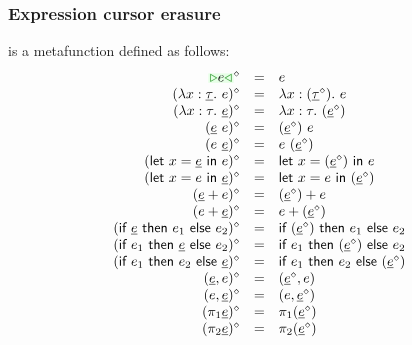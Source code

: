 \documentclass[formalism.tex]{subfiles}
\begin{document}
\subsubsection{Expression cursor erasure}
\label{sec:untyped-expression-cursor-erasure}
\judgbox{\ensuremath{\cursorErase{\ZMV}}} is a metafunction defined as follows:
%
\[\begin{array}{rcl}
  \cursorErasesToRow{\ZCursor{\EMV}}{\EMV} \\
  \cursorErasesToRow{(\ZLamT{x}{\ZTMV}{\EMV})}{\ELam{x}{(\cursorErase{\ZTMV})}{\EMV}} \\
  \cursorErasesToRow{(\ZLamE{x}{\TMV}{\ZMV})}{\ELam{x}{\TMV}{(\cursorErase{\ZMV})}} \\
  \cursorErasesToRow{(\ZApL{\ZMV}{\EMV})}{\EAp{(\cursorErase{\ZMV})}{\EMV}} \\
  \cursorErasesToRow{(\ZApR{\EMV}{\ZMV})}{\EAp{\EMV}{(\cursorErase{\ZMV})}} \\
  \cursorErasesToRow{(\ZLetL{x}{\ZMV}{\EMV})}{\ELet{x}{(\cursorErase{\ZMV})}{\EMV}} \\
  \cursorErasesToRow{(\ZLetR{x}{\EMV}{\ZMV})}{\ELet{x}{\EMV}{(\cursorErase{\ZMV})}} \\
  \cursorErasesToRow{(\ZPlusL{\ZMV}{\EMV})}{\EPlus{(\cursorErase{\ZMV})}{\EMV}} \\
  \cursorErasesToRow{(\ZPlusR{\EMV}{\ZMV})}{\EPlus{\EMV}{(\cursorErase{\ZMV})}} \\
  \cursorErasesToRow{(\ZIfC{\ZMV}{\EMV_1}{\EMV_2})}{\EIf{(\cursorErase{\ZMV})}{\EMV_1}{\EMV_2}} \\
  \cursorErasesToRow{(\ZIfL{\EMV_1}{\ZMV}{\EMV_2})}{\EIf{\EMV_1}{(\cursorErase{\ZMV})}{\EMV_2}} \\
  \cursorErasesToRow{(\ZIfL{\EMV_1}{\EMV_2}{\ZMV})}{\EIf{\EMV_1}{\EMV_2}{(\cursorErase{\ZMV})}} \\
  \cursorErasesToRow{\ZPairL{\ZMV}{\EMV}}{\EPair{\cursorErase{\ZMV}}{\EMV}} \\
  \cursorErasesToRow{\ZPairR{\EMV}{\ZMV}}{\EPair{\EMV}{\cursorErase{\ZMV}}} \\
  \cursorErasesToRow{(\ZProjL{\ZMV})}{\EProjL{(\cursorErase{\ZMV})}} \\
  \cursorErasesToRow{(\ZProjR{\ZMV})}{\EProjR{(\cursorErase{\ZMV})}} \\
\end{array}\]
\end{document}
